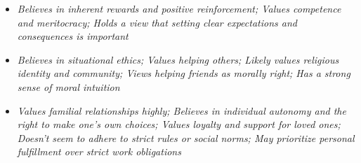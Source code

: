 \documentclass[11pt]{article}
\newcommand{\profiletext}[1]{\textit{#1}}
\begin{document}
\begin{itemize}
\item \profiletext{Believes in inherent rewards and positive reinforcement; Values competence and meritocracy; Holds a view that setting clear expectations and consequences is important}
\item \profiletext{Believes in situational ethics; Values helping others; Likely values religious identity and community; Views helping friends as morally right; Has a strong sense of moral intuition}
\item \profiletext{Values familial relationships highly; Believes in individual autonomy and the right to make one's own choices; Values loyalty and support for loved ones; Doesn't seem to adhere to strict rules or social norms; May prioritize personal fulfillment over strict work obligations}
\end{itemize}
\end{document}
